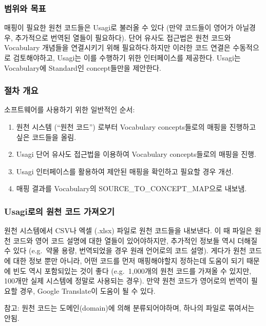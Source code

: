 \documentclass[11pt]{book}
\providecommand{\tightlist}{%
  \setlength{\itemsep}{0pt}\setlength{\parskip}{0pt}}
\theoremstyle{definition}
\theoremstyle{definition}
\theoremstyle{definition}
\theoremstyle{remark}
\begin{document}
\subsubsection*{범위와 목표}\label{--2}

매핑이 필요한 원천 코드들은 Usagi로 불러올 수 있다 (만약 코드들이 영어가
아닐경우, 추가적으로 번역된 열들이 필요하다). 단어 유사도 접근법은 원천
코드와 Vocabulary 개념들을 연결시키기 위해 필요하다.하지만 이러한 코드
연결은 수동적으로 검토해야하고, Usagi는 이를 수행하기 위한 인터페이스를
제공한다. Usagi는 Vocabulary에 Standard인 concept들만을 제안한다.

\subsubsection*{절차 개요}\label{--2}

소프트웨어를 사용하기 위한 일반적인 순서:

\begin{enumerate}
\def\labelenumi{\arabic{enumi}.}
\tightlist
\item
  원천 시스템 (``원천 코드'') 로부터 Vocabulary concepts들로의 매핑을
  진행하고 싶은 코드들을 올림.
\item
  Usagi 단어 유사도 접근법을 이용하여 Vocabulary concepts들로의 매핑을
  진행.
\item
  Usagi 인터페이스를 활용하여 제안된 매핑을 확인하고 필요할 경우 개선.
\item
  매핑 결과를 Vocabulary의 SOURCE\_TO\_CONCEPT\_MAP으로 내보냄.
\end{enumerate}

\subsubsection{Usagi로의 원천 코드 가져오기}\label{usagi---}

원천 시스템에서 CSV나 엑셀 (.xlsx) 파일로 원천 코드들을 내보낸다. 이 때
파일은 원천 코드와 영어 코드 설명에 대한 열들이 있어야하지만, 추가적인
정보들 역시 더해질 수 있다 (e.g.~약물 용량, 번역되었을 경우 원래
언어로의 코드 설명). 게다가 원천 코드에 대한 정보 뿐만 아니라, 어떤
코드를 먼저 매핑해야할지 정하는데 도움이 되기 때문에 빈도 역시
포함되있는 것이 좋다 (e.g.~1,000개의 원천 코드를 가져올 수 있지만,
100개만 실제 시스템에 정말로 사용되는 경우). 만약 원천 코드가 영어로의
번역이 필요할 경우, Google Translate이 도움이 될 수 있다.

참고: 원천 코드는 도메인(domain)에 의해 분류되어야하며, 하나의 파일로
묶여서는 안됨.
\end{document}
